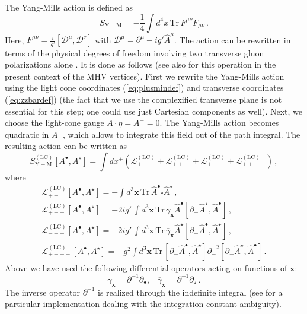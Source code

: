 \documentclass[english,american]{article}
\begin{document}
The Yang-Mills action is defined as
\begin{equation}
S_{\mathrm{Y-M}}=-\frac{1}{4}\int d^{4}x\,\mathrm{Tr}\, F^{\mu\nu}F_{\mu\nu}\,.
\end{equation}
Here, $F^{\mu\nu}=\frac{i}{g'}\left[\mathcal{D}^{\mu},\mathcal{D}^{\nu}\right]$
with $\mathcal{D}^{\mu}=\partial^{\mu}-ig'\hat{A}^{\mu}$. The action can be rewritten
in terms of the physical degrees of freedom involving two transverse gluon
polarizations alone \citep{Scherk1975}. It is done as follows (see
also \citep{Mansfield2006} for this operation in the present context
of the MHV vertices). First we rewrite the Yang-Mills action using
the light cone coordinates (\ref{eq:plusmindef}) and transverse coordinates
(\ref{eq:zzbardef}) (the fact that we use the complexified transverse
plane is not essential for this step; one could use just Cartesian
components as well). Next, we choose the light-cone
gauge $A\cdot\eta=A^{+}=0$. The Yang-Mills action becomes quadratic in
$A^{-}$, which allows to integrate this field out of the path integral.
The resulting action can be written as 
\begin{equation}
S_{\mathrm{Y-M}}^{\left(\mathrm{LC}\right)}\left[A^{\bullet},A^{\star}\right]=\int dx^{+}\left(\mathcal{L}_{+-}^{\left(\mathrm{LC}\right)}+\mathcal{L}_{++-}^{\left(\mathrm{LC}\right)}+\mathcal{L}_{+--}^{\left(\mathrm{LC}\right)}+\mathcal{L}_{++--}^{\left(\mathrm{LC}\right)}\right)\,,\label{eq:actionLC}
\end{equation}
where
\begin{gather}
\mathcal{L}_{+-}^{\left(\mathrm{LC}\right)}\left[A^{\bullet},A^{\star}\right]=-\int d^{3}\mathbf{x}\,\mathrm{Tr}\,\hat{A}^{\bullet}\square\hat{A}^{\star}\,,\\
\mathcal{L}_{++-}^{\left(\mathrm{LC}\right)}\left[A^{\bullet},A^{\star}\right]=-2ig'\,\int d^{3}\mathbf{x}\,\mathrm{Tr}\,\gamma_{\mathbf{x}}\hat{A}^{\bullet}\left[\partial_{-}\hat{A}^{\star},\hat{A}^{\bullet}\right]\,,\\
\mathcal{L}_{--+}^{\left(\mathrm{LC}\right)}\left[A^{\bullet},A^{\star}\right]=-2ig'\,\int d^{3}\mathbf{x}\,\mathrm{Tr}\,\overline{\gamma}_{\mathbf{x}}\hat{A}^{\star}\left[\partial_{-}\hat{A}^{\bullet},\hat{A}^{\star}\right]\,,\\
\mathcal{L}_{++--}^{\left(\mathrm{LC}\right)}\left[A^{\bullet},A^{\star}\right]=-g^{2}\int d^{3}\mathbf{x}\,\mathrm{Tr}\,\left[\partial_{-}\hat{A}^{\bullet},\hat{A}^{\star}\right]\partial_{-}^{-2}\left[\partial_{-}\hat{A}^{\star},\hat{A}^{\bullet}\right]\,.
\end{gather}
Above we have used the following differential operators acting on
functions of $\mathbf{x}$:
\begin{equation}
\gamma_{\mathbf{x}}=\partial_{-}^{-1}\partial_{\bullet},\,\,\,\,\,\overline{\gamma}_{\mathbf{x}}=\partial_{-}^{-1}\partial_{\star}\,.\label{eq:gamma_op_def}
\end{equation}
The inverse operator $\partial_{-}^{-1}$ is realized through the
indefinite integral (see \citep{Scherk1975} for a particular implementation
dealing with the integration constant ambiguity). 
\end{document}
